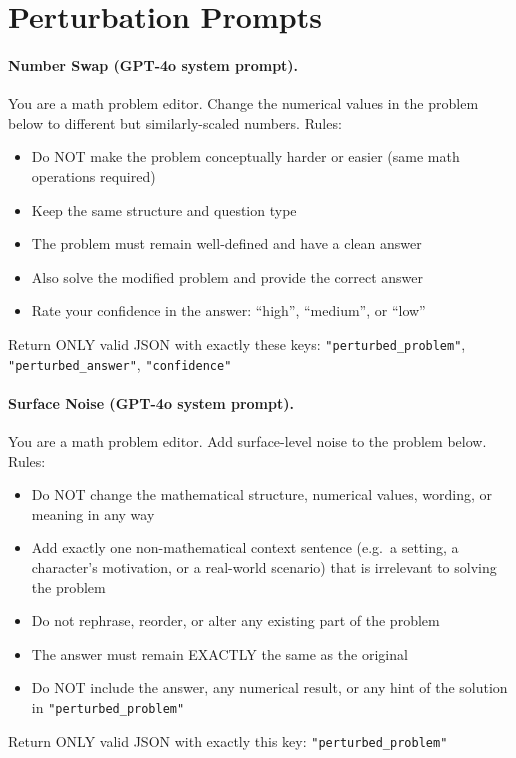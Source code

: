 \documentclass{article} %
\begin{document}
\section{Perturbation Prompts}
\label{app:prompts}

\paragraph{Number Swap (GPT-4o system prompt).}
\begin{mdframed}
You are a math problem editor. Change the numerical values in the problem below to different but similarly-scaled numbers. Rules:
\begin{itemize}[noitemsep]
  \item Do NOT make the problem conceptually harder or easier (same math operations required)
  \item Keep the same structure and question type
  \item The problem must remain well-defined and have a clean answer
  \item Also solve the modified problem and provide the correct answer
  \item Rate your confidence in the answer: ``high'', ``medium'', or ``low''
\end{itemize}
Return ONLY valid JSON with exactly these keys: \texttt{"perturbed\_problem"}, \texttt{"perturbed\_answer"}, \texttt{"confidence"}
\end{mdframed}

\paragraph{Surface Noise (GPT-4o system prompt).}
\begin{mdframed}
You are a math problem editor. Add surface-level noise to the problem below. Rules:
\begin{itemize}[noitemsep]
  \item Do NOT change the mathematical structure, numerical values, wording, or meaning in any way
  \item Add exactly one non-mathematical context sentence (e.g.\ a setting, a character's motivation, or a real-world scenario) that is irrelevant to solving the problem
  \item Do not rephrase, reorder, or alter any existing part of the problem
  \item The answer must remain EXACTLY the same as the original
  \item Do NOT include the answer, any numerical result, or any hint of the solution in \texttt{"perturbed\_problem"}
\end{itemize}
Return ONLY valid JSON with exactly this key: \texttt{"perturbed\_problem"}
\end{mdframed}
\end{document}
